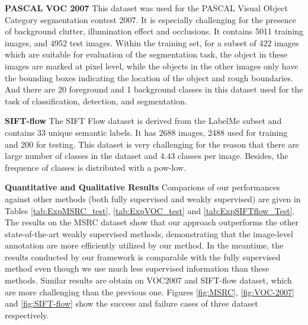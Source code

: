 \textbf{PASCAL VOC 2007}
This dataset was used for the PASCAL Visual Object Category segmentation contest 2007. It is especially challenging for the presence of background clutter, illumination effect and occlusions. It contains 5011 training images, and 4952 test images. Within the training set, for a subset of 422 images which are suitable for evaluation of the segmentation task, the object in these images are marked at pixel level, while the objects in the other images only have the bounding boxes indicating the location of the object and rough boundaries. And there are 20 foreground and 1 background classes in this dataset used for the task of classification, detection, and segmentation.


\textbf{SIFT-flow} The SIFT Flow dataset\cite{liu2011nonparametric} is derived from the LabelMe subset and contains 33 unique semantic labels. It has 2688 images, 2488 used for training and 200 for testing. This dataset is very challenging for the reason that there are large number of classes in the dataset and $4.43$ classes per image. Besides, the frequence of classes is distributed with a pow-low.

\textbf{Quantitative and Qualitative Results} Comparions of our performances against other methods (both fully supervised and weakly supervised) are given in Tables \ref{tab:ExpMSRC_test}, \ref{tab:ExpVOC_test} and \ref{tab:ExpSIFTflow_Test}. The results on the MSRC dataset show that our approach outperforms the other state-of-the-art weakly supervised methods, demonstrating that the image-level annotation are more efficiently utilized by our method. In the meantime, the results conducted by our framework is comparable with the fully supervised method even though we use much less supervised information than these methods. Similar results are obtain on VOC2007 and SIFT-flow dataset, which are more challenging than the previous one. Figures \ref{fig:MSRC}, \ref{fig:VOC-2007} and \ref{fig:SIFT-flow} show the success and failure cases of three dataset respectively.

